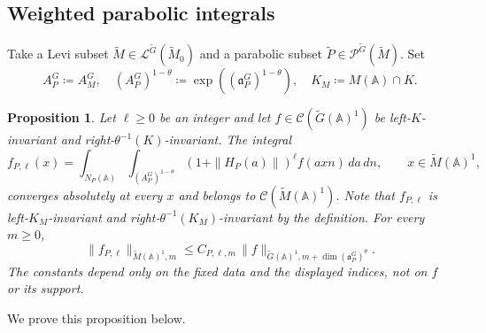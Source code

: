 \documentclass[12pt]{amsart}
\theoremstyle{definition}
\theoremstyle{plain}
\newtheorem{proposition}[definition]{Proposition}
\theoremstyle{remark}
\def\A{\mathbb{A}}%
\newcommand{\fa}{\mathfrak{a}}
\newcommand{\cC}{\mathcal{C}}
\newcommand{\cL}{\mathcal{L}}
\numberwithin{equation}{section}
\newcommand{\tG}{\widetilde{G}}
\newcommand{\tM}{\widetilde{M}}
\begin{document}
\subsection{Weighted parabolic integrals}
Take a Levi subset $\tM\in \cL^{\tG}(\tM_0)$ and a parabolic subset $\widetilde P\in\mathcal P^{\widetilde G}(\widetilde M)$. 
Set
\[
A_P^G\coloneqq A_M^G, \quad (A_P^G)^{1-\theta}\coloneqq \exp((\fa_P^G)^{1-\theta}),\quad  K_{M}\coloneqq M(\A)\cap K.
\]
\begin{proposition}\label{prop:biKP}
Let $\ell\ge0$ be an integer and let
$f\in\cC(\widetilde G(\A)^1)$ be left-$K$-invariant and right-$\theta^{-1}(K)$-invariant.
The integral
\begin{equation}\label{eq:biK-weighted-definition}
 f_{P,\ell}(x)
 =\int_{N_P(\A)}\int_{(A_P^G)^{1-\theta}}
       (1+\|H_P(a)\|)^\ell f(axn)\,da\,dn,\qquad x\in\widetilde M(\A)^1,
\end{equation}
converges absolutely at every $x$ and belongs to
$\cC(\widetilde M(\A)^1)$.
Note that $f_{P,\ell}$ is left-$K_M$-invariant and right-$\theta^{-1}(K_M)$-invariant by the definition. 
For every $m\ge0$,
\begin{equation*}
 \|f_{P,\ell}\|_{\widetilde M(\A)^1,m}
 \le C_{P,\ell,m}\,
       \|f\|_{\widetilde G(\A)^1,m+\dim (\mathfrak a_P^G)^{\theta}}.
\end{equation*}
The constants depend only on the fixed data and the displayed indices,
not on $f$ or its support. 
\end{proposition}

We prove this proposition below.
\end{document}
